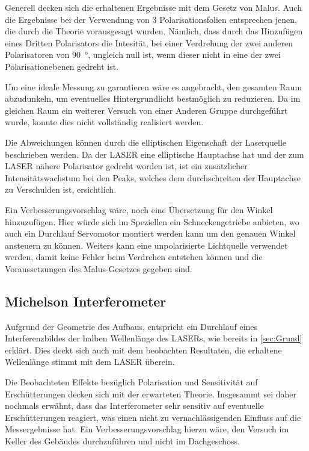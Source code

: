\documentclass[12pt,english,ngerman]{scrartcl}
\begin{document}
Generell decken sich die erhaltenen Ergebnisse mit dem Gesetz von Malus. Auch
die Ergebnisse bei der Verwendung von 3 Polarisationsfolien entsprechen jenen,
die durch die Theorie vorausgesagt wurden. Nämlich, dass durch das Hinzufügen
eines Dritten Polarisators die Intesität, bei einer Verdrehung der zwei
anderen Polarisatoren von \SI{90}{\degree}, ungleich null ist, wenn dieser
nicht in eine der zwei Polarisationebenen gedreht ist.

Um eine ideale Messung zu garantieren wäre es angebracht, den gesamten Raum
abzudunkeln, um eventuelles Hintergrundlicht bestmöglich zu reduzieren. Da im
gleichen Raum ein weiterer Versuch von einer Anderen Gruppe durchgeführt wurde,
konnte dies nicht vollständig realisiert werden.

Die Abweichungen können durch die elliptischen Eigenschaft der Laserquelle beschrieben werden.
Da der LASER eine elliptische Hauptachse hat und der zum LASER nähere Polarisator gedreht 
worden ist, ist ein zusätzlicher Intensitätswachstum bei den Peaks, welches dem 
durchschreiten der Hauptachse zu Verschulden ist, ersichtlich.


Ein Verbesserungsvorschlag wäre, noch eine Übersetzung für den Winkel hinzuzufügen.
Hier würde sich im Speziellen ein Schneckengetriebe anbieten, wo auch ein Durchlauf Servomotor
montiert werden kann um den genauen Winkel ansteuern zu können.
Weiters kann eine unpolarisierte Lichtquelle verwendet werden, damit keine Fehler beim
Verdrehen entstehen können und die Voraussetzungen des Malus-Gesetzes gegeben sind.


\subsection{Michelson Interferometer}

Aufgrund der Geometrie des Aufbaus, entspricht ein Durchlauf eines
Interferenzbildes der halben Wellenlänge des LASERs, wie bereits in
\autoref{sec:Grund} erklärt. Dies deckt sich auch mit dem beobachten
Resultaten, die erhaltene Wellenlänge stimmt mit dem LASER überein.

Die Beobachteten Effekte bezüglich Polarisation und Sensitivität auf
Erschütterungen decken sich mit der erwarteten Theorie. Insgesammt sei daher
nochmals erwähnt, dass das Interferometer sehr sensitiv auf eventuelle
Erschütterungen reagiert, was einen nicht zu vernachlässigenden Einfluss auf
die Messergebnisse hat. Ein Verbesserungsvorschlag hierzu wäre, den Versuch im
Keller des Gebäudes durchzuführen und nicht im Dachgeschoss.
\end{document}
